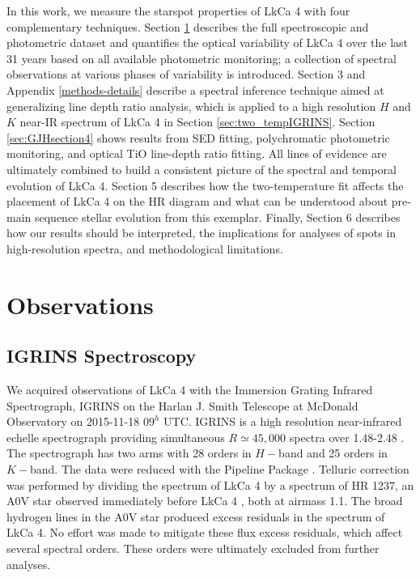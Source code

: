 \documentclass[twocolumn]{emulateapj}%
\newcommand{\name}{LkCa 4 }
\begin{document}
In this work, we measure the starspot properties of LkCa 4 with four complementary techniques.  Section \ref{sec:obs} describes the full spectroscopic and photometric dataset and 
quantifies the optical variability of LkCa 4 over the last 31 years based on all available photometric monitoring; a collection of spectral observations at various phases of variability is introduced.  Section 3 and Appendix \ref{methods-details} describe a spectral inference technique aimed at generalizing line depth ratio analysis, which is applied to a high resolution $H$ and $K$ near-IR spectrum of LkCa 4 in Section \ref{sec:two_tempIGRINS}.  Section \ref{sec:GJHsection4} shows results from SED fitting, polychromatic photometric monitoring, and optical TiO line-depth ratio fitting.  All lines of evidence are ultimately combined to build a consistent picture of the spectral and temporal evolution of LkCa 4.  Section 5 describes how the two-temperature fit affects the placement of LkCa 4 on the HR diagram and what can be understood about pre-main sequence stellar evolution from this exemplar.  Finally, Section 6 describes how our results should be interpreted, the implications for analyses of spots in high-resolution spectra, and methodological limitations.


\section{Observations}\label{sec:obs} 

\subsection{IGRINS Spectroscopy}\label{sec:igrins} 
We acquired observations of LkCa 4 with the Immersion Grating Infrared Spectrograph, IGRINS \citep{park14} on the Harlan J. Smith Telescope at McDonald Observatory on 2015-11-18 $09^h$ UTC.  IGRINS is a high resolution near-infrared echelle spectrograph providing simultaneous $R\simeq45,000$ spectra over 1.48-2.48 \um.  The spectrograph has two arms with 28 orders in $H-$band and 25 orders in $K-$band.  The data were reduced with the Pipeline Package \citep{jaejoonlee15}.  Telluric correction was performed by dividing the spectrum of \name by a spectrum of HR 1237, an A0V star observed immediately before \name, both at airmass 1.1.  The broad hydrogen lines in the A0V star produced excess residuals in the spectrum of LkCa 4.  No effort was made to mitigate these flux excess residuals, which affect several spectral orders.  These orders were ultimately excluded from further analyses.
\end{document}
